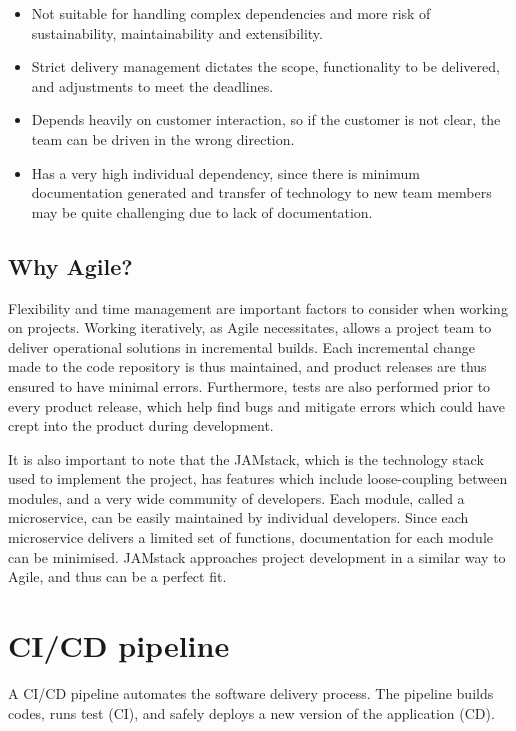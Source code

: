 \begin{itemize}
    \item Not suitable for handling complex dependencies and more risk of sustainability, maintainability and extensibility.
    \item Strict delivery management dictates the scope, functionality to be delivered, and adjustments to meet the deadlines.
    \item Depends heavily on customer interaction, so if the customer is not clear, the team can be driven in the wrong direction.
    \item Has a very high individual dependency, since there is minimum documentation generated and transfer of technology to new 
    team members may be quite challenging due to lack of documentation.
\end{itemize}

\subsection{Why Agile?}

Flexibility and time management are important factors to consider when working on projects.
Working iteratively, as Agile necessitates, allows a project team to deliver operational solutions in incremental builds.
Each incremental change made to the code repository is thus maintained, and product releases are thus ensured to have minimal errors.
Furthermore, tests are also performed prior to every product release, which help find bugs and mitigate errors which 
could have crept into the product during development.

It is also important to note that the JAMstack, which is the technology stack used to implement the project, 
has features which include loose-coupling between modules, and a very wide community of developers. Each module, 
called a microservice, can be easily maintained by individual developers. Since each microservice delivers a limited 
set of functions, documentation for each module can be minimised. JAMstack approaches project development in a 
similar way to Agile, and thus can be a perfect fit.

\section{CI/CD pipeline}

A CI/CD pipeline automates the software delivery process. The pipeline builds codes, runs test (CI),
and safely deploys a new version of the application (CD).

